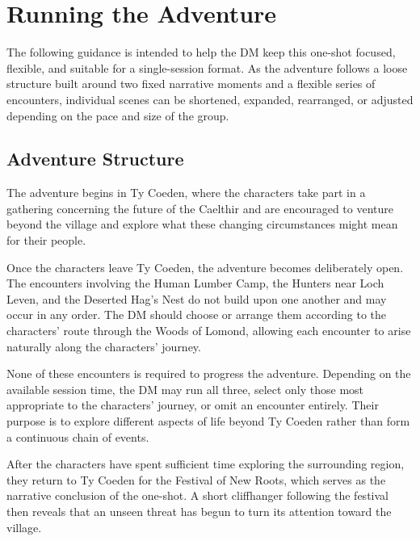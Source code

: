 \section*{\LARGE Running the Adventure}
{\entryfont The following guidance is intended to help the DM keep this one-shot focused, flexible, and suitable for a single-session format. As the adventure follows a loose structure built around two fixed narrative moments and a flexible series of encounters, individual scenes can be shortened, expanded, rearranged, or adjusted depending on the pace and size of the group.}
\subsection*{Adventure Structure}
{\entryfont The adventure begins in Ty Coeden, where the characters take part in a gathering concerning the future of the Caelthir and are encouraged to venture beyond the village and explore what these changing circumstances might mean for their people.

Once the characters leave Ty Coeden, the adventure becomes deliberately open. The encounters involving the Human Lumber Camp, the Hunters near Loch Leven, and the Deserted Hag's Nest do not build upon one another and may occur in any order. The DM should choose or arrange them according to the characters' route through the Woods of Lomond, allowing each encounter to arise naturally along the characters' journey.

None of these encounters is required to progress the adventure. Depending on the available session time, the DM may run all three, select only those most appropriate to the characters' journey, or omit an encounter entirely. Their purpose is to explore different aspects of life beyond Ty Coeden rather than form a continuous chain of events.

After the characters have spent sufficient time exploring the surrounding region, they return to Ty Coeden for the Festival of New Roots, which serves as the narrative conclusion of the one-shot. A short cliffhanger following the festival then reveals that an unseen threat has begun to turn its attention toward the village.}
